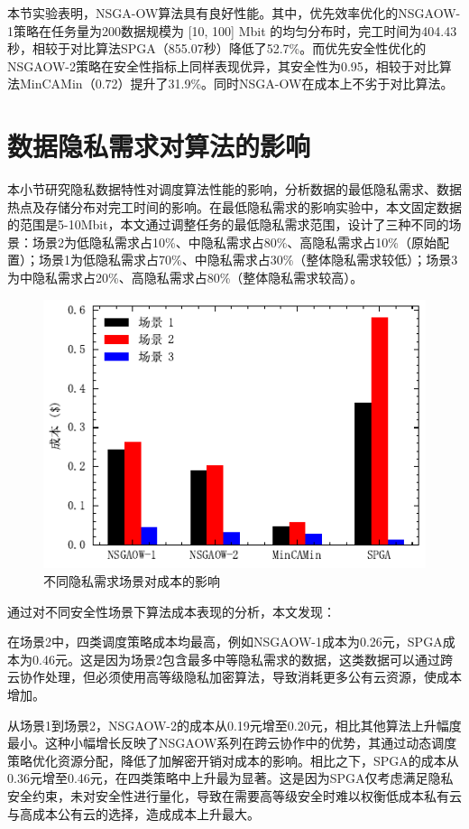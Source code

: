 本节实验表明，NSGA-OW算法具有良好性能。其中，优先效率优化的NSGAOW-1策略在任务量为200数据规模为 [10, 100] Mbit 的均匀分布时，完工时间为404.43秒，相较于对比算法SPGA（855.07秒）降低了52.7\%。而优先安全性优化的NSGAOW-2策略在安全性指标上同样表现优异，其安全性为0.95，相较于对比算法MinCAMin（0.72）提升了31.9\%。同时NSGA-OW在成本上不劣于对比算法。

\section{数据隐私需求对算法的影响}

本小节研究隐私数据特性对调度算法性能的影响，分析数据的最低隐私需求、数据热点及存储分布对完工时间的影响。在最低隐私需求的影响实验中，本文固定数据的范围是5-10Mbit，本文通过调整任务的最低隐私需求范围，设计了三种不同的场景：场景2为低隐私需求占10\%、中隐私需求占80\%、高隐私需求占10\%（原始配置）；场景1为低隐私需求占70\%、中隐私需求占30\%（整体隐私需求较低）；场景3为中隐私需求占20\%、高隐私需求占80\%（整体隐私需求较高）。

\begin{figure}[htb]
    \includegraphics{img/min_secu_vs_cost.pdf}
    \caption{不同隐私需求场景对成本的影响}
\end{figure}

通过对不同安全性场景下算法成本表现的分析，本文发现：

在场景2中，四类调度策略成本均最高，例如NSGAOW-1成本为0.26元，SPGA成本为0.46元。这是因为场景2包含最多中等隐私需求的数据，这类数据可以通过跨云协作处理，但必须使用高等级隐私加密算法，导致消耗更多公有云资源，使成本增加。

从场景1到场景2，NSGAOW-2的成本从0.19元增至0.20元，相比其他算法上升幅度最小。这种小幅增长反映了NSGAOW系列在跨云协作中的优势，其通过动态调度策略优化资源分配，降低了加解密开销对成本的影响。相比之下，SPGA的成本从0.36元增至0.46元，在四类策略中上升最为显著。这是因为SPGA仅考虑满足隐私安全约束，未对安全性进行量化，导致在需要高等级安全时难以权衡低成本私有云与高成本公有云的选择，造成成本上升最大。

